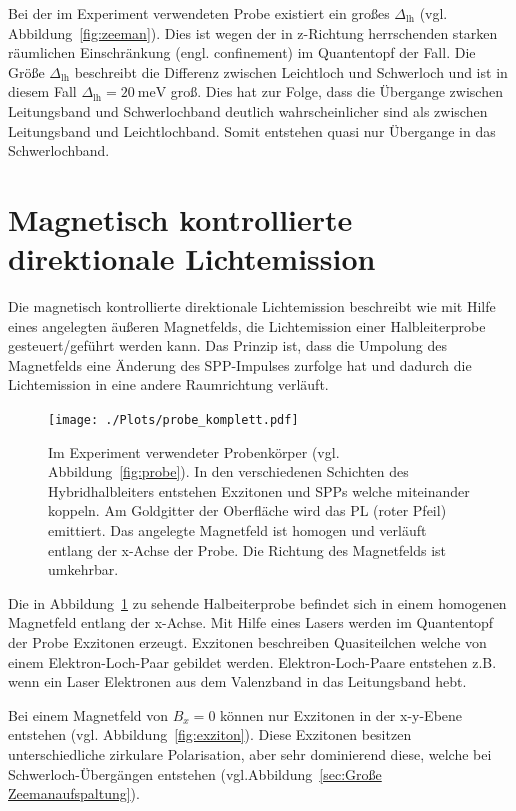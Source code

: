 Bei der im Experiment verwendeten Probe existiert ein großes $\Delta_\text{lh}$ (vgl. Abbildung~\ref{fig:zeeman}).
Dies ist wegen der in z-Richtung herrschenden starken räumlichen Einschränkung (engl. confinement) im Quantentopf der Fall.
Die Größe $\Delta_\text{lh}$ beschreibt die Differenz zwischen Leichtloch und Schwerloch und ist
in diesem Fall $\Delta_\text{lh}= \SI{20}{\milli\eV}$ groß.
Dies hat zur Folge, dass die Übergange zwischen Leitungsband und Schwerlochband deutlich
wahrscheinlicher sind als zwischen Leitungsband und Leichtlochband. Somit entstehen quasi nur 
Übergange in das Schwerlochband.


\section{Magnetisch kontrollierte direktionale Lichtemission}\label{sec:pl}
Die magnetisch kontrollierte direktionale Lichtemission
beschreibt wie mit Hilfe eines angelegten äußeren Magnetfelds, die Lichtemission
einer Halbleiterprobe gesteuert/geführt werden kann.
Das Prinzip ist, dass die Umpolung des Magnetfelds eine Änderung des SPP-Impulses zurfolge hat 
und dadurch die Lichtemission in eine andere Raumrichtung verläuft.
\begin{figure}
    \centering
    \texttt{[image: ./Plots/probe\_komplett.pdf]}
    \caption{Im Experiment verwendeter Probenkörper (vgl. Abbildung~\ref{fig:probe}).
    In den verschiedenen Schichten des Hybridhalbleiters entstehen Exzitonen und SPPs 
    welche miteinander koppeln. Am Goldgitter der Oberfläche wird das PL (roter Pfeil)
    emittiert.    
    Das angelegte Magnetfeld ist homogen und verläuft entlang der x-Achse der Probe.
    Die Richtung des Magnetfelds ist umkehrbar.}
    \label{fig:komplett}
\end{figure}
\FloatBarrier

Die in Abbildung~\ref{fig:komplett} zu sehende Halbeiterprobe befindet sich 
in einem homogenen Magnetfeld entlang der x-Achse.
Mit Hilfe eines Lasers werden im Quantentopf der Probe Exzitonen erzeugt.
Exzitonen beschreiben Quasiteilchen welche von einem Elektron-Loch-Paar gebildet werden.
Elektron-Loch-Paare entstehen z.B. wenn ein Laser 
Elektronen aus dem Valenzband in das Leitungsband hebt.\cite{jens}

Bei einem Magnetfeld von $B_{x} = 0$ können nur Exzitonen in der x-y-Ebene entstehen (vgl. Abbildung~\ref{fig:exziton}).\cite{felix}
Diese Exzitonen besitzen unterschiedliche zirkulare Polarisation, aber sehr dominierend diese, welche bei 
Schwerloch-Übergängen entstehen (vgl.Abbildung~\ref{sec:Große Zeemanaufspaltung}).

